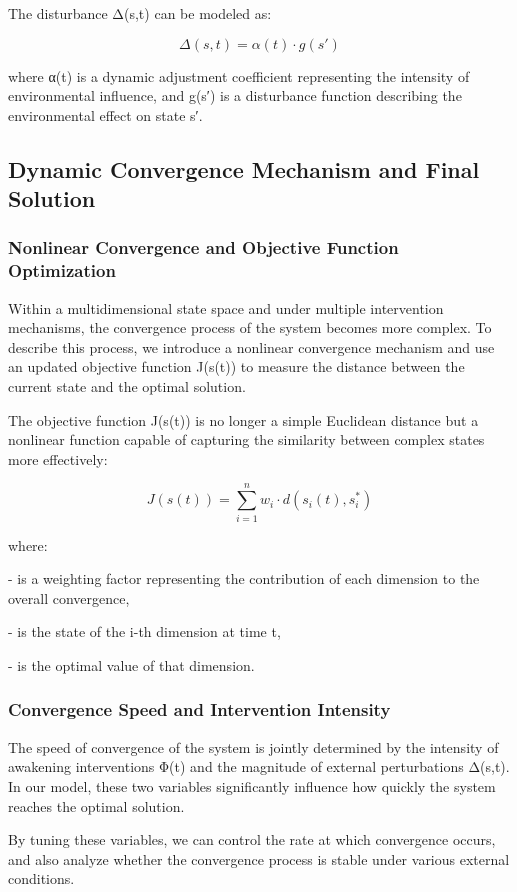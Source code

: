 \documentclass{article}
\begin{document}
The disturbance Δ(s,t) can be modeled as:

\[ \Delta(s,t) = \alpha(t) \cdot g(s') \]

where α(t) is a dynamic adjustment coefficient representing the intensity of environmental influence, and g(s′) is a disturbance function describing the environmental effect on state s′.

\subsection{Dynamic Convergence Mechanism and Final Solution}

\subsubsection{Nonlinear Convergence and Objective Function Optimization}

Within a multidimensional state space and under multiple intervention mechanisms, the convergence process of the system becomes more complex. To describe this process, we introduce a nonlinear convergence mechanism and use an updated objective function J(s(t)) to measure the distance between the current state and the optimal solution.

The objective function J(s(t)) is no longer a simple Euclidean distance but a nonlinear function capable of capturing the similarity between complex states more effectively:

\[ J(s(t)) = \sum_{i=1}^n w_i \cdot d(s_i(t), s_i^*) \]

where:

-  is a weighting factor representing the contribution of each dimension to the overall convergence,

-  is the state of the i-th dimension at time t,

-  is the optimal value of that dimension.

\subsubsection{Convergence Speed and Intervention Intensity}

The speed of convergence of the system is jointly determined by the intensity of awakening interventions Φ(t) and the magnitude of external perturbations Δ(s,t). In our model, these two variables significantly influence how quickly the system reaches the optimal solution.

By tuning these variables, we can control the rate at which convergence occurs, and also analyze whether the convergence process is stable under various external conditions.
\end{document}
